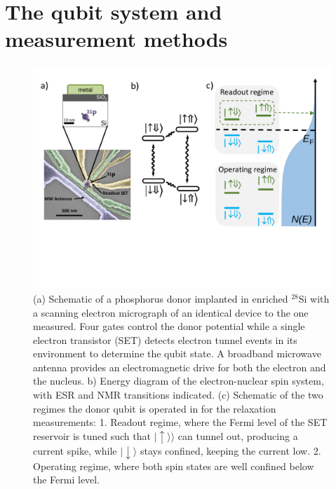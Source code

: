 \documentclass[%
 reprint,
 amsmath,amssymb,
 aps,
]{revtex4-1}
\newcommand {\ket} [1] {|{ #1 \rangle}}
\begin{document}
\section{\label{sec:background} The qubit system and measurement methods}

\begin{figure}
\centering
\includegraphics[width=\columnwidth]{fig1.pdf}
\caption{
(a) Schematic of a phosphorus donor implanted in enriched $^{28}$Si with a scanning electron micrograph of an identical device to the one measured. Four gates control the donor potential while a single electron transistor (SET) detects electron tunnel events in its environment to determine the qubit state. A broadband microwave antenna provides an electromagnetic drive for both the electron and the nucleus. b) Energy diagram of the electron-nuclear spin system, with ESR and NMR transitions indicated. (c) Schematic of the two regimes the donor qubit is operated in for the relaxation measurements: 1. Readout regime, where the Fermi level of the SET reservoir is tuned such that $\ket{\uparrow}\rangle$ can tunnel out, producing a current spike, while $\ket{\downarrow}$ stays confined, keeping the current low. 2. Operating regime, where both spin states are well confined below the Fermi level.
}
\label{fig:device}
\end{figure}
\end{document}
